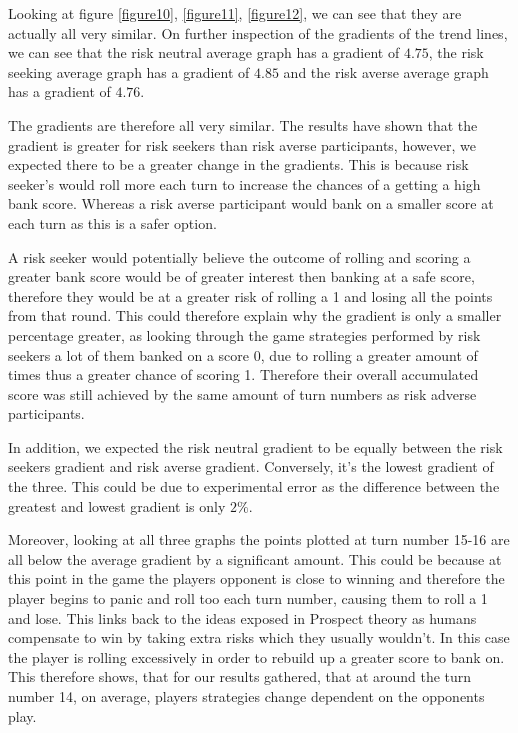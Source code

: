 \documentclass[a4paper,titlepage]{article}
\begin{document}
Looking at figure \ref{figure10}, \ref{figure11}, \ref{figure12}, we can see that they are actually all very similar. On further inspection of the gradients of the trend lines, we can see that the risk neutral average graph has a gradient of $4.75$, the risk seeking average graph has a gradient of $4.85$ and the risk averse average graph has a gradient of $4.76$.

The gradients are therefore all very similar. The results have shown that the gradient is greater for risk seekers than risk averse participants, however, we expected there to be a greater change in the gradients. This is because risk seeker’s would roll more each turn to increase the chances of a getting a high bank score. Whereas a risk averse participant would bank on a smaller score at each turn as this is a safer option.

A risk seeker would potentially believe the outcome of rolling and scoring a greater bank score would be of greater interest then banking at a safe score, therefore they would be at a greater risk of rolling a 1 and losing all the points from that round. This could therefore explain why the gradient is only a smaller percentage greater, as looking through the game strategies performed by risk seekers a lot of them banked on a score 0, due to rolling a greater amount of times thus a greater chance of scoring 1. Therefore their overall accumulated score was still achieved by the same amount of turn numbers as risk adverse participants.

In addition, we expected the risk neutral gradient to be equally between the risk seekers gradient and risk averse gradient. Conversely, it’s the lowest gradient of the three. This could be due to experimental error as the difference between the greatest and lowest gradient is only $2\%$.

Moreover, looking at all three graphs the points plotted at turn number 15-16 are all below the average gradient by a significant amount. This could be because at this point in the game the players opponent is close to winning and therefore the player begins to panic and roll too each turn number, causing them to roll a 1 and lose. This links back to the ideas exposed in Prospect theory as humans compensate to win by taking extra risks which they usually wouldn’t. In this case the player is rolling excessively in order to rebuild up a greater score to bank on. This therefore shows, that for our results gathered, that at around the turn number 14, on average, players strategies change dependent on the opponents play.
\end{document}
